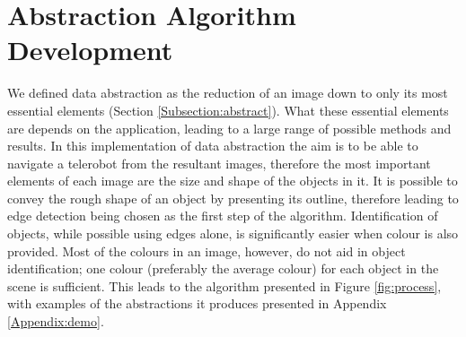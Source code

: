 \chapter{Abstraction Algorithm Development}
\label{chapter:abstract}

We defined data abstraction as the reduction of an image down to only its most essential elements (Section \ref{Subsection:abstract}). What these essential elements are depends on the application, leading to a large range of possible methods and results. In this implementation of data abstraction the aim is to be able to navigate a telerobot from the resultant images, therefore the most important elements of each image are the size and shape of the objects in it. It is possible to convey the rough shape of an object by presenting its outline, therefore leading to edge detection being chosen as the first step of the algorithm. Identification of objects, while possible using edges alone, is significantly easier when colour is also provided. Most of the colours in an image, however, do not aid in object identification; one colour (preferably the average colour) for each object in the scene is sufficient. This leads to the algorithm presented in Figure \ref{fig:process}, with examples of the abstractions it produces presented in Appendix \ref{Appendix:demo}.

